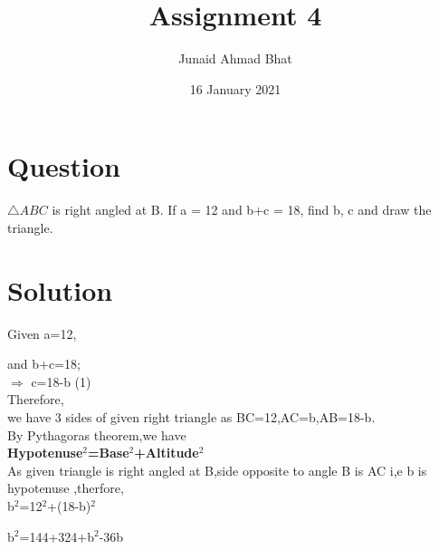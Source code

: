 \documentclass[a4paper,12pt]{article}
\begin{document}
\title{Assignment 4}
\author{Junaid Ahmad Bhat}
\date{16 January 2021}
\maketitle
\section*{\small Question}

$\triangle  ABC$ is right angled at B. If a = 12 and b+c =
18, find b, c and draw the triangle.

\section*{\small Solution}

Given \hspace*{3.8cm} a=12,\\

\vspace*{1mm}

and  \hspace*{3cm}  b+c=18;\\

$\Rightarrow$  \hspace*{3.5cm} c=18-b    \hspace*{1.5cm}(1)\\

Therefore,\\
\hspace*{0.5cm} we have 3 sides of given right triangle as BC=12,AC=b,AB=18-b.\\

By Pythagoras theorem,we have\\

\textbf{Hypotenuse$^2$=Base$^2$+Altitude$^2$}\\

As given triangle is right angled at B,side opposite to angle B is AC i,e b is\\

hypotenuse ,therfore,\\


 \hspace*{3cm} b$^2$=12$^2$+(18-b)$^2$\\ 

\vspace*{0.3cm}

 \hspace*{3cm} b$^2$=144+324+b$^2$-36b\\
\end{document}
